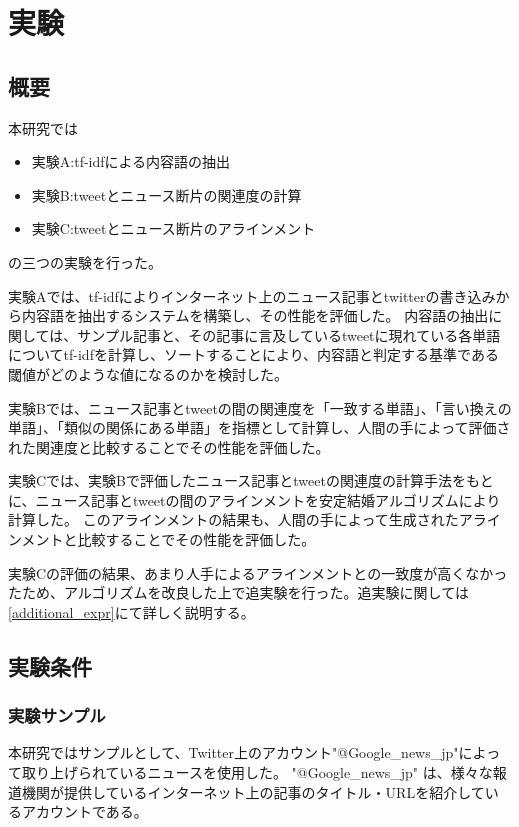 \documentclass[12pt]{jarticle}
\begin{document}

\section{実験}
\def\googlenews{Google\_news\_jp}
\subsection{概要}

本研究では
\begin{itemize}
\item 実験A:tf-idfによる内容語の抽出
\item 実験B:tweetとニュース断片の関連度の計算
\item 実験C:tweetとニュース断片のアラインメント
\end{itemize}
の三つの実験を行った。

実験Aでは、tf-idfによりインターネット上のニュース記事とtwitterの書き込みから内容語を抽出するシステムを構築し、その性能を評価した。
内容語の抽出に関しては、サンプル記事と、その記事に言及しているtweetに現れている各単語についてtf-idfを計算し、ソートすることにより、内容語と判定する基準である閾値がどのような値になるのかを検討した。

実験Bでは、ニュース記事とtweetの間の関連度を「一致する単語」、「言い換えの単語」、「類似の関係にある単語」を指標として計算し、人間の手によって評価された関連度と比較することでその性能を評価した。

実験Cでは、実験Bで評価したニュース記事とtweetの関連度の計算手法をもとに、ニュース記事とtweetの間のアラインメントを安定結婚アルゴリズムにより計算した。
このアラインメントの結果も、人間の手によって生成されたアラインメントと比較することでその性能を評価した。

実験Cの評価の結果、あまり人手によるアラインメントとの一致度が高くなかったため、アルゴリズムを改良した上で追実験を行った。追実験に関しては\ref{additional_expr}にて詳しく説明する。

\subsection{実験条件}
\subsubsection{実験サンプル}
本研究ではサンプルとして、Twitter上のアカウント"@\googlenews "によって取り上げられているニュースを使用した。
"@\googlenews" は、様々な報道機関が提供しているインターネット上の記事のタイトル・URLを紹介しているアカウントである。
\end{document}
